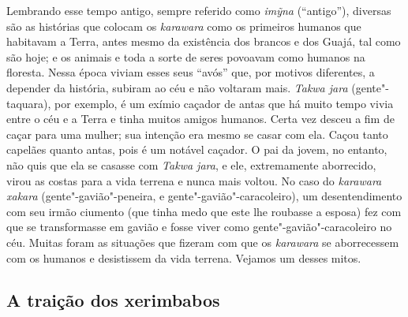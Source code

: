 Lembrando esse tempo antigo, sempre referido como \emph{imỹna}
(``antigo''), diversas são as histórias que colocam os \emph{karawara}
como os primeiros humanos que habitavam a Terra, antes mesmo da
existência dos brancos e dos Guajá, tal como são hoje; e os animais e
toda a sorte de seres povoavam como humanos na floresta. Nessa época
viviam esses seus ``avós'' que, por motivos diferentes, a depender da
história, subiram ao céu e não voltaram mais. \emph{Takwa jara}
(gente"-taquara), por exemplo, é um exímio caçador de antas que há muito
tempo vivia entre o céu e a Terra e tinha muitos amigos humanos. Certa
vez desceu a fim de caçar para uma mulher; sua intenção era mesmo se
casar com ela. Caçou tanto capelães quanto antas, pois é um notável
caçador. O pai da jovem, no entanto, não quis que ela se casasse com
\emph{Takwa jara}, e ele, extremamente aborrecido, virou as costas para
a vida terrena e nunca mais voltou. No caso do \emph{karawara}
\emph{xakara} (gente"-gavião"-peneira, e gente"-gavião"-caracoleiro), um
desentendimento com seu irmão ciumento (que tinha medo que este lhe
roubasse a esposa) fez com que se transformasse em gavião e fosse viver
como gente"-gavião"-caracoleiro no céu. Muitas foram as situações que
fizeram com que os \emph{karawara} se aborrecessem com os humanos e
desistissem da vida terrena. Vejamos um desses mitos.


\subsection{A traição dos xerimbabos}

